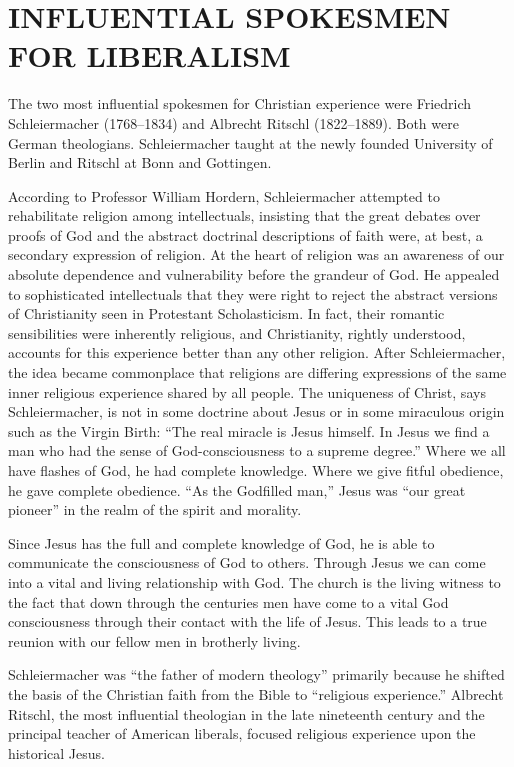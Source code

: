\section{INFLUENTIAL SPOKESMEN FOR LIBERALISM}

The two most influential spokesmen for Christian experience were Friedrich Schleiermacher
(1768–1834) and Albrecht Ritschl (1822–1889). Both were German theologians. Schleiermacher taught at
the newly founded University of Berlin and Ritschl at Bonn and Gottingen.

According to Professor William Hordern, Schleiermacher attempted to rehabilitate religion among
intellectuals, insisting that the great debates over proofs of God and the abstract doctrinal
descriptions of faith were, at best, a secondary expression of religion. At the heart of religion
was an awareness of our absolute dependence and vulnerability before the grandeur of God. He
appealed to sophisticated intellectuals that they were right to reject the abstract versions of
Christianity seen in Protestant Scholasticism. In fact, their romantic sensibilities were inherently
religious, and Christianity, rightly understood, accounts for this experience better than any other
religion. After Schleiermacher, the idea became commonplace that religions are differing expressions
of the same inner religious experience shared by all people. The uniqueness of Christ, says
Schleiermacher, is not in some doctrine about Jesus or in some miraculous origin such as the Virgin
Birth: “The real miracle is Jesus himself. In Jesus we find a man who had the sense of
God-consciousness to a supreme degree.” Where we all have flashes of God, he had complete knowledge.
Where we give fitful obedience, he gave complete obedience. “As the Godfilled man,” Jesus was “our
great pioneer” in the realm of the spirit and morality.

Since Jesus has the full and complete knowledge of God, he is able to communicate the consciousness
of God to others. Through Jesus we can come into a vital and living relationship with God. The
church is the living witness to the fact that down through the centuries men have come to a vital
God consciousness through their contact with the life of Jesus. This leads to a true reunion with
our fellow men in brotherly living.

Schleiermacher was “the father of modern theology” primarily because he shifted the basis of the
Christian faith from the Bible to “religious experience.” Albrecht Ritschl, the most influential
theologian in the late nineteenth century and the principal teacher of American liberals, focused
religious experience upon the historical Jesus.

